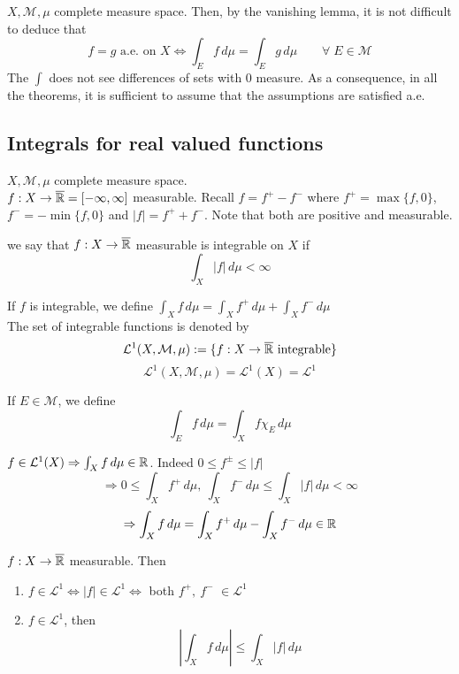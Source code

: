 \begin{remark}
    \(X, \mathcal{M}, \mu\) complete measure space. Then, by the vanishing lemma, it is not difficult to deduce that 
    \[
        f=g \text{ a.e. on } X \Leftrightarrow \int_E f \, d\mu = \int_E g \, d\mu \qquad \forall\; E \in \mathcal{M}
    \]
    The \(\int\) does not see differences of sets with 0 measure. As a consequence, in all the theorems, it is sufficient to assume that the assumptions are satisfied a.e. 
\end{remark}


\subsection*{Integrals for real valued functions}
\(X, \mathcal{M}, \mu\) complete measure space. \\
\(f: X \to \overline{\mathbb{R}} = [-\infty, \infty]\) measurable. Recall \(f= f^+ - f^- \) where \(f^+ = \max{\{f, 0\}}\), \(f^- = -\min{\{f, 0\}} \) and \(|f|= f^+ + f^-\). 
Note that both are positive and measurable. 

\begin{definition}
    we say that \(f:X \to \overline{\mathbb{R}}\) measurable is integrable on \(X\) if 
    \[
        \int_X |f| \, d\mu < \infty
    \]
\end{definition}

If \(f\) is integrable, we define \(\int_X f \, d\mu = \int_X f^+ \, d\mu + \int_X f^- \, d\mu\) \\
The set of integrable functions is denoted by 
\[
    \mathcal{L}^1 (X, \mathcal{M}, \mu) := \{f:X \to \overline{\mathbb{R}} \text{ integrable} \} 
\]
\[
    \mathcal{L}^1 (X, \mathcal{M}, \mu) 
    = \mathcal{L}^1 (X) 
    = \mathcal{L}^1 
\]

If \(E \in \mathcal{M}\), we define
\[
    \int_E f \, d\mu = \int_X f \chi_E \, d\mu
\]

\begin{remark}
    \(f \in \mathcal{L}^1(X) \Rightarrow \int_X f \, d\mu \in \mathbb{R}\). Indeed \(0 \leq f^\pm \leq |f|\)
    \[
        \Rightarrow 0 \leq \int_X f^+ \, d\mu ,\ \int_X f^- \, d\mu \leq \int_X |f| \, d\mu < \infty 
    \] 
    \[
        \Rightarrow \int_X f \, d\mu = \int_X f^+ \, d\mu - \int_X f^- \, d\mu \in \mathbb{R}
    \]
\end{remark}

\begin{proposition}
    \(f : X \to \overline{\mathbb{R}} \) measurable. Then
    \begin{enumerate}
        \item \(f \in \mathcal{L}^1 \Leftrightarrow |f| \in \mathcal{L}^1 \Leftrightarrow \) both \(f^+, \ f^-\) \(\in \mathcal{L}^1\)
        \item \(f \in \mathcal{L}^1 \), then 
        \[
            \left| \int_X f \, d\mu \right| \leq \int_X |f| \, d\mu  \tag{triangle inequality}
        \]
    \end{enumerate}
\end{proposition}

